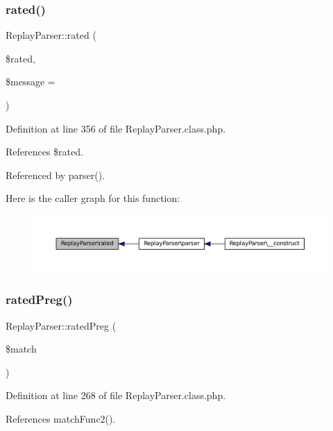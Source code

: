 \subsubsection{\texorpdfstring{rated()}{rated()}}
{\footnotesize\ttfamily Replay\+Parser\+::rated (\begin{DoxyParamCaption}\item[{}]{\$rated,  }\item[{}]{\$message = {\ttfamily \textquotesingle{}\textquotesingle{}} }\end{DoxyParamCaption})}



Definition at line 356 of file Replay\+Parser.\+class.\+php.



References \$rated.



Referenced by parser().

Here is the caller graph for this function\+:\nopagebreak
\begin{figure}[H]
\begin{center}
\leavevmode
\includegraphics[width=350pt]{class_replay_parser_aedbd02d59b5048e0f558e234a2e28c24_icgraph}
\end{center}
\end{figure}
\mbox{\label{class_replay_parser_abde1f69b95e0b0f1960b92e79cc0ac46}} 
\subsubsection{\texorpdfstring{rated\+Preg()}{ratedPreg()}}
{\footnotesize\ttfamily Replay\+Parser\+::rated\+Preg (\begin{DoxyParamCaption}\item[{}]{\$match }\end{DoxyParamCaption})}



Definition at line 268 of file Replay\+Parser.\+class.\+php.



References match\+Func2().

